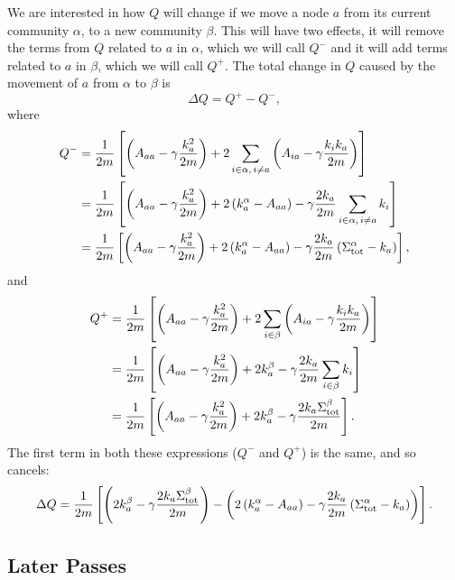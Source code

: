 \documentclass{article}
\begin{document}
We are interested in how $Q$ will change if we move a node $a$ from its 
current community $\alpha$, to a new community $\beta$.
This will have two effects, it will remove the terms from $Q$ 
related to $a$ in $\alpha$, which we will call $Q^-$ and it will add terms 
related to $a$ in $\beta$, which we will call $Q^+$. 
The total change in $Q$ caused by the movement of $a$ from $\alpha$ to $\beta$ is 
\begin{equation}
	\Delta Q = Q^{+} - Q^{-},
\end{equation}
where
\begin{align*}
Q^- &= \frac{1}{2m}\left[ \left( A_{aa} - \gamma \frac{k_a^2}{2m} \right) 
+ 2\sum_{i \in \alpha, \, i \neq a} \left( A_{ia} - \gamma \frac{k_ik_a}{2m} \right) \right] \\
	&= \frac{1}{2m}\left[ \left( A_{aa} - \gamma \frac{k_a^2}{2m} \right) 
+ 2 \left( k_{a}^{\alpha} -A_{aa}\right) - \gamma \frac{2k_a}{2m}\sum_{i \in \alpha, \, i \neq a} k_i \right] \\
	&= \frac{1}{2m}\left[ \left( A_{aa} - \gamma \frac{k_a^2}{2m} \right) 
+ 2 \left( k_{a}^{\alpha} -A_{aa}\right) - \gamma \frac{2k_a}{2m}\left( \Sigma_{\text{tot}}^{\alpha} - k_a \right)  \right], \\
\end{align*}
and
\begin{align*}
Q^+ &= \frac{1}{2m}\left[ \left( A_{aa} - \gamma \frac{k_a^2}{2m} \right) 
+ 2\sum_{i \in \beta} \left( A_{ia} - \gamma \frac{k_ik_a}{2m} \right) \right] \\
		&= \frac{1}{2m}\left[ \left( A_{aa} - \gamma \frac{k_a^2}{2m} \right) 
+ 2k_{a}^{\beta} - \gamma \frac{2k_a}{2m}\sum_{i \in \beta} k_i \right] \\
		&= \frac{1}{2m}\left[ \left( A_{aa} - \gamma \frac{k_a^2}{2m} \right) 
+ 2k_{a}^{\beta} - \gamma \frac{2k_a\Sigma_{\text{tot}}^{\beta}}{2m} \right]. \\
\end{align*}
The first term in both these expressions ($Q^-$ and $Q^+$) is the same, and so cancels:
\begin{equation}
\Delta Q = \frac{1}{2m}\left[ \left( 2k_{a}^{\beta} - \gamma \frac{2k_a\Sigma_{\text{tot}}^{\beta}}{2m} \right) 
		- \left( 2 \left( k_{a}^{\alpha} -A_{aa}\right) - \gamma \frac{2k_a}{2m}\left( \Sigma_{\text{tot}}^{\alpha} - k_a \right) \right) \right]. 
\end{equation}
 
\subsection{Later Passes}
\label{sec:laterPasses}
\end{document}
